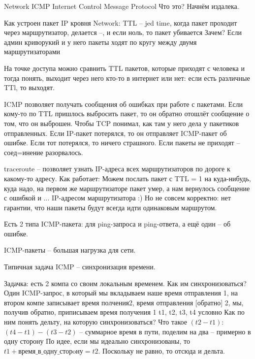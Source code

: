 Network		ICMP
Internet Control Message Protocol
Что это? Начнём издалека.

Как устроен пакет IP кровня Network:
TTL -- jed time, когда пакет проходит через маршрутизатор, делается --, и если ноль, то пакет убивается
Зачем?
Если админ криворукий и у него пакеты ходят%
по кругу между двумя маршрутизаторами

На точке доступа можно сравнить TTL пакетов, которые приходят с человека и тогда понять, выходит через него кто-то в интернет или нет: если есть различные TTl, то выходят.

ICMP позволяет получать сообщения об ошибках при работе с пакетами. Если кому-то по TTL пришлось выбросить пакет, то он обратно отошлёт сообщение о том, что он выброшен. Чтобы TCP понимал, как там у него дела у пакетиков отправленных.
Если IP-пакет потерялся, то он отправляет ICMP-пакет об ошибке. Если тот потерялся, то ничего страшного. Если пакеты не приходят -- соед=инение разорвалось.

traceroute -- позволяет узнать IP-адреса всех маршрутизаторов по дороге к какому-то адресу.
Как работает:
Можем послать пакет с TTL = 1 на куда-нибудь, куда надо, на первом же маршрутизаторе пакет умер, а нам вернулось сообщение с ошибкой и ... IP-адресом маршрутизатора :)
Но не совсем корректно: нет гарантии, что наши пакеты будут всегда идти одинаковым маршрутом.

Есть 2 типа ICMP-пакета: для ping-запроса и ping-ответа, а ещё один -- об ошибке.

ICMP-пакеты -- большая нагрузка для сети.

Типичная задача ICMP -- синхронизация времени.

Задачка: есть 2 компа со своим локальным временем. Как им синхронизоваться? 
Один ICMP-запрос, в который мы вкладываем наше время отправления 1, на втором компе записывает время полчения2, время отправления [обратно] 2, мы, получив обратно, приписываем время получения 1
t1, t2, t3, t4 условно
Как по ним понять дельту, на которую синхронизоваться?
Что такое $(t2 - t1)$: 
$(t4 - t1) - (t3 - t2)$ -- суммарное время в пути, поделим на два -- примерно в одну сторону
По идее, если мы идеально синхронизованы, то $t1 + \text{время\_в\_одну\_сторoну} = t2$. Поскольку не равно, то отсюда и дельта.


